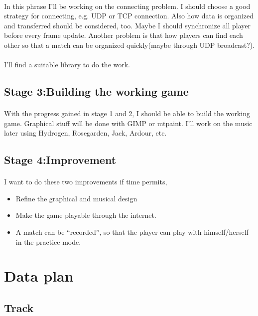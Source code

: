 \documentclass{article}
\begin{document}
    \paragraph{}
        In this phrase I'll be working on the connecting problem. I should choose a good strategy for connecting, e.g. UDP or TCP connection. Also how data is organized and transferred should be considered, too. Maybe I should synchronize all player before every frame update. Another problem is that how players can find each other so that a match can be organized quickly(maybe through UDP broadcast?).
    \paragraph{}
        I'll find a suitable library to do the work.
    \subsection*{Stage 3:Building the working game}
    \paragraph{}
        With the progress gained in stage 1 and 2, I should be able to build the working game. Graphical stuff will be done with GIMP or mtpaint. I'll work on the music later using Hydrogen, Rosegarden, Jack, Ardour, etc.
    \subsection*{Stage 4:Improvement}
    \paragraph{}
        I want to do these two improvements if time permits,
    \\
    \begin{itemize}
        \item Refine the graphical and musical design
        \item Make the game playable through the internet.
        \item A match can be ``recorded'', so that the player can play with himself/herself in the practice mode.
    \end{itemize}
\section{Data plan}
    \subsection*{Track}
\end{document}
